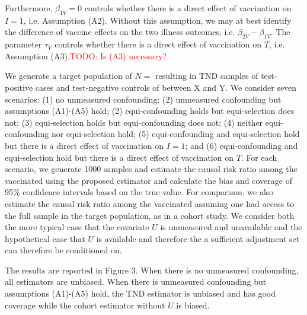 \documentclass[11pt]{article}
\begin{document}
Furthermore, $\beta_{1V}=0$ controls whether there is a direct effect of vaccination on $I = 1$, i.e. Assumption (A2). Without this assumption, we may at best identify the difference of vaccine effects on the two illness outcomes, i.e. $\beta_{2V}-\beta_{1V}$. The parameter $\tau_V$ controls whether there is a direct effect of vaccination on $T$, i.e. Assumption (A3).\textcolor{red}{TODO: Is (A3) necessary?}

We generate a target population of $N = $ resulting in TND samples of test-positive cases and test-negative controls of between X and Y. We consider seven scenarios: (1) no unmeasured confounding; (2) unmeasured confounding but assumptions (A1)-(A5) hold; (2) equi-confounding holds but equi-selection does not; (3) equi-selection holds but equi-confounding does not; (4) neither equi-confounding nor equi-selection hold; (5) equi-confounding and equi-selection hold but there is a direct effect of vaccination on $I = 1$; and (6) equi-confounding and equi-selection hold but there is a direct effect of vaccination on $T$. For each scenario, we generate 1000 samples and estimate the causal risk ratio among the vaccinated using the proposed estimator and calculate the bias and coverage of 95\% confidence intervals based on the true value. For comparison, we also estimate the causal risk ratio among the vaccinated assuming one had access to the full sample in the target population, as in a cohort study. We consider both the more typical case that the covariate $U$ is unmeasured and unavailable and the hypothetical case that $U$ is available and therefore the a sufficient adjustment set can therefore be conditioned on. 

The results are reported in Figure 3. When there is no unmeasured confounding, all estimators are unbiased. When there is unmeasured confounding but assumptions (A1)-(A5) hold, the TND estimator is unbiased and has good coverage while the cohort estimator without $U$ is biased. %
\end{document}
